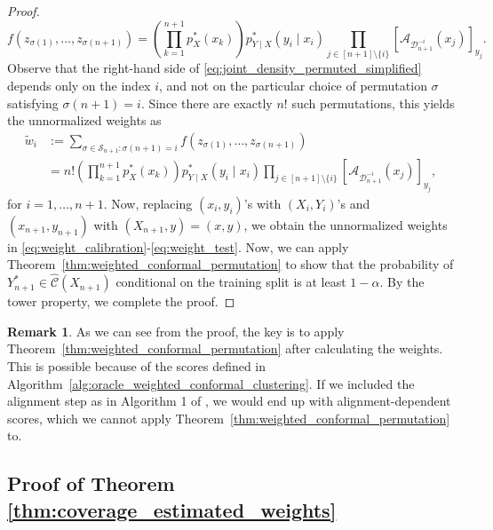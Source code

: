 \documentclass[11pt,letterpaper]{article}
\theoremstyle{definition}
\newtheorem{remark}{Remark}
\newcommand{\cC}{\mathcal{C}}
\newcommand{\cD}{\mathcal{D}}
\begin{document}
\begin{proof}
\begin{equation}
    f(z_{\sigma(1)},\ldots,z_{\sigma(n+1)})
    =
    \left(\prod_{k=1}^{n+1} p_X^\ast(x_k)\right)
    p_{Y\mid X}^\ast(y_i \mid x_i)
    \prod_{j \in [n + 1] \setminus \{i\}} \left[\mathcal A_{\cD_{n+1}^{-i}}(x_j)\right]_{y_j}.
\end{equation}
Observe that the right-hand side of \eqref{eq:joint_density_permuted_simplified} depends only on the index \(i\), and not on the particular choice of permutation \(\sigma\) satisfying \(\sigma(n+1)=i\). Since there are exactly \(n!\) such permutations, this yields the unnormalized weights as
\begin{equation}
\label{eq:unnormalized_weights}
\begin{split}
    \tilde w_i 
    & := \sum_{\sigma \in \mathcal{S}_{n+1}:\sigma(n+1)=i} f(z_{\sigma(1)},\ldots,z_{\sigma(n+1)}) \\
    & =
    n!\left(\prod_{k=1}^{n+1} p_X^\ast(x_k)\right)
    p_{Y\mid X}^\ast(y_i \mid x_i)
    \prod_{j \in [n + 1] \setminus \{i\}} \left[\mathcal A_{\cD_{n+1}^{-i}}(x_j)\right]_{y_j},
\end{split}
\end{equation}
for $i=1,\ldots,n+1$. Now, replacing $(x_i, y_i)$'s with $(X_i, Y_i)$'s and $(x_{n + 1}, y_{n + 1})$ with $(X_{n + 1}, y) = (x, y)$, we obtain the unnormalized weights in \eqref{eq:weight_calibration}-\eqref{eq:weight_test}. Now, we can apply Theorem~\ref{thm:weighted_conformal_permutation} to show that the probability of $Y_{n + 1}^\ast \in \hat{\cC}(X_{n + 1})$ conditional on the training split is at least $1 - \alpha$. By the tower property, we complete the proof.
\end{proof}

\begin{remark}
    \label{rmk:why_no_alignment}
    As we can see from the proof, the key is to apply Theorem~\ref{thm:weighted_conformal_permutation} after calculating the weights. This is possible because of the scores defined in Algorithm~\ref{alg:oracle_weighted_conformal_clustering}. If we included the alignment step as in Algorithm 1 of \cite{hur2026inference}, we would end up with alignment-dependent scores, which we cannot apply Theorem~\ref{thm:weighted_conformal_permutation} to. 
\end{remark}

\subsection{Proof of Theorem \ref{thm:coverage_estimated_weights}}
\end{document}
